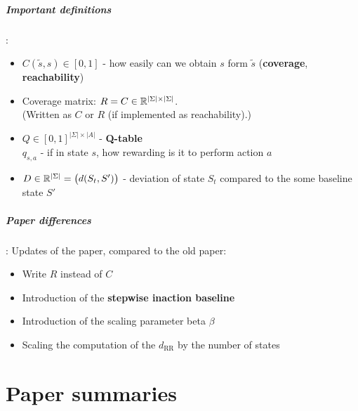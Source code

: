 \paragraph{Important definitions}:
\begin{itemize}
	\item $C(\tilde{s}, s) \in [0,1]$ - how easily can we obtain $s$ form $\tilde{s}$ (\textbf{coverage}, \textbf{reachability})
	\item Coverage matrix: $R=C\in \mathbb{R}^{|\Sigma|\times|\Sigma|}$.\\
	(Written as $C$ or $R$ (if implemented as reachability).)
	\item $Q \in [0,1]^{|\Sigma|\times |A|}$ - \textbf{Q-table}\\
	$q_{s,a}$ - if in state $s$, how rewarding is it to perform action $a$
	\item $D \in \mathbb{R}^{|\Sigma|} = \begin{pmatrix}
		d(S_t, S')
	\end{pmatrix}$ - deviation of state $S_t$ compared to the some baseline state $S'$
\end{itemize} 

\paragraph{Paper differences}: Updates of the \cite{2018_Krakovna_penaslizing} paper, compared to the old \cite{2018_Krakovna_measuring} paper:
\begin{itemize}
	\item Write $R$ instead of $C$
	\item Introduction of the \textbf{stepwise inaction baseline}
	\item Introduction of the scaling parameter beta $\beta$
	\item Scaling the computation of the $d_{\text{RR}}$ by the number of states
\end{itemize}

\chapter{Paper summaries}

